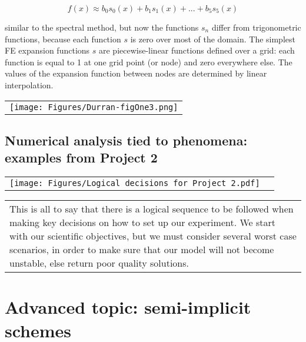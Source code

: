 	\begin{equation}
		f(x)\approx b_0s_0(x)+b_1s_1(x)+...+b_5s_5(x)
	\end{equation}	

	similar to the spectral method, but now the functions $s_n$ differ from trigonometric functions, because each function $s$ is zero over most of the domain. The simplest FE expansion functions $s$ are piecewise-linear functions defined over a grid: each function is equal to 1 at one grid point (or node) and zero everywhere else. The values of the expansion function between nodes are determined by linear interpolation.
	
	\begin{center}
		\begin{tabular}{c}
			\texttt{[image: Figures/Durran-figOne3.png]}
		\end{tabular}
	\end{center}
	

\subsection{Numerical analysis tied to phenomena: examples from Project 2}
	
\begin{center}
	\begin{tabular}{cc}
			\texttt{[image: Figures/Logical decisions for Project 2.pdf]}
	\end{tabular}
\end{center}

\begin{tabular}{l}
			This is all to say that there is a logical sequence to be followed when making key decisions on how to set up our experiment. We start with our scientific objectives, but we must consider several worst case scenarios, in order to make sure that our model will not become unstable, else return poor quality solutions.
\end{tabular}		



\section{Advanced topic: semi-implicit schemes}
